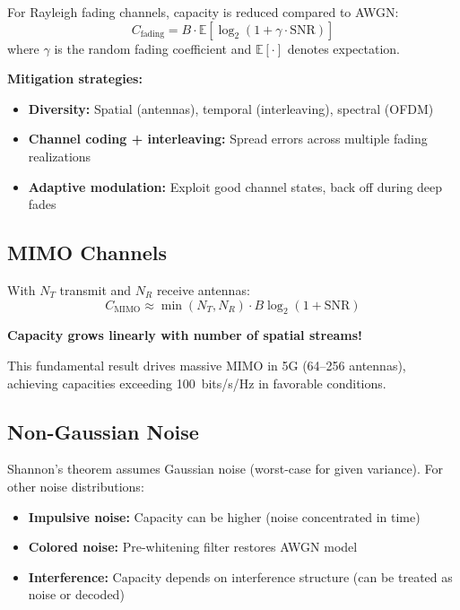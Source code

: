 For Rayleigh fading channels, capacity is reduced compared to AWGN:
\begin{equation}
C_{\text{fading}} = B \cdot \mathbb{E}\left[\log_2(1 + \gamma \cdot \mathrm{SNR})\right]
\end{equation}
where $\gamma$ is the random fading coefficient and $\mathbb{E}[\cdot]$ denotes expectation.

\textbf{Mitigation strategies:}
\begin{itemize}
\item \textbf{Diversity:} Spatial (antennas), temporal (interleaving), spectral (OFDM)
\item \textbf{Channel coding + interleaving:} Spread errors across multiple fading realizations
\item \textbf{Adaptive modulation:} Exploit good channel states, back off during deep fades
\end{itemize}

\subsection{MIMO Channels}

With $N_T$ transmit and $N_R$ receive antennas:
\begin{equation}
C_{\text{MIMO}} \approx \min(N_T, N_R) \cdot B \log_2(1 + \mathrm{SNR})
\end{equation}

\textbf{Capacity grows linearly with number of spatial streams!}

This fundamental result drives massive MIMO in 5G (64--256 antennas), achieving capacities exceeding 100~bits/s/Hz in favorable conditions.

\subsection{Non-Gaussian Noise}

Shannon's theorem assumes Gaussian noise (worst-case for given variance). For other noise distributions:
\begin{itemize}
\item \textbf{Impulsive noise:} Capacity can be higher (noise concentrated in time)
\item \textbf{Colored noise:} Pre-whitening filter restores AWGN model
\item \textbf{Interference:} Capacity depends on interference structure (can be treated as noise or decoded)
\end{itemize}

